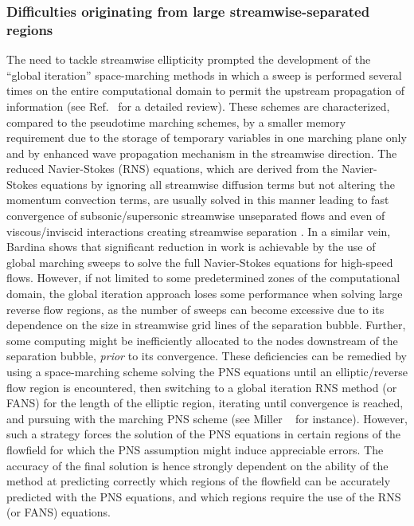 \subsubsection{Difficulties originating from large streamwise-separated regions}

The need to tackle streamwise ellipticity prompted the development
of the ``global iteration'' space-marching methods in which
a sweep is performed several times on the entire computational
domain to permit the upstream propagation of information
(see Ref.~\cite{aiaa:2000:miller} for a detailed review).
These schemes are characterized, compared to the pseudotime marching schemes,
by a smaller memory requirement due to the storage
of temporary variables in one marching plane only and by
enhanced wave propagation mechanism in the streamwise
direction. The reduced Navier-Stokes (RNS) equations, which are derived from
the Navier-Stokes equations by ignoring all streamwise diffusion terms but
not altering the momentum convection terms,
are usually solved in this manner leading to fast convergence of subsonic/supersonic
streamwise unseparated flows \cite{aiaa:1988:power,jcp:1989:chang,aiaa:2000:yamaleev}
and even of viscous/inviscid interactions creating streamwise separation
\cite{cf:1983:rubin,aiaa:1986:barnett}. In a similar vein,
Bardina \cite{aiaaconf:1994:bardina} shows that significant reduction in work
is achievable by the use of  global marching sweeps to solve the full
Navier-Stokes equations for high-speed flows. However, if not limited to some
predetermined zones of the computational domain, the global iteration
approach loses some performance when solving large reverse flow regions,
as the number of sweeps can become excessive due to its dependence
on the size in streamwise grid lines of the separation bubble.
Further, some computing might be inefficiently
allocated to the nodes downstream of the separation bubble, \emph{prior} to its
convergence. These deficiencies can be remedied by using a space-marching
scheme solving the PNS equations until an elliptic/reverse flow region is
encountered, then switching to a global iteration RNS method (or FANS)
for the length of the
elliptic region, iterating until convergence is reached, and pursuing with
the marching PNS scheme (see Miller \etal\ \cite{aiaa:2000:miller} for instance).
However, such a strategy forces the solution of the PNS equations in certain
regions of the flowfield for which the PNS assumption might induce
appreciable errors. The accuracy of the final solution is hence strongly
dependent on the ability of the method at predicting correctly which
regions of the flowfield can be accurately predicted with the PNS equations,
and which regions require the use of the RNS (or FANS) equations.



